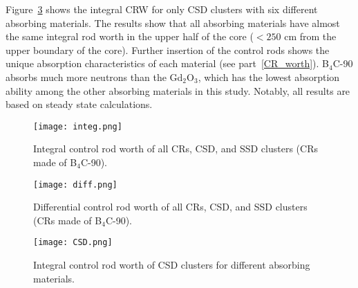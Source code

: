 Figure~\ref{fig:CSD} shows the integral CRW for only CSD clusters with six 
different absorbing materials. The results show that all absorbing materials 
have almost the same integral rod worth in the upper half of the core 
($<250$ cm from the upper boundary of the core). Further insertion of the 
control rods shows the unique absorption characteristics of each material (see 
part~\ref{CR_worth}). B$_4$C-90 absorbs much more neutrons than the 
Gd$_2$O$_3$, which has the lowest absorption ability among the other absorbing 
materials in this study. Notably, all results are based on steady state calculations. 

\begin{figure}
	\centering
	\texttt{[image: integ.png]}
	\vspace{-0.5in}
	\caption{Integral control rod worth of all CRs, CSD, and SSD clusters (CRs made of B$_4$C-90).} 
	\label{fig:integ}
\end{figure}
\begin{figure}
	\centering
	\texttt{[image: diff.png]}
	\vspace{-0.5in}
	\caption{Differential control rod worth of all CRs, CSD, and SSD clusters (CRs made of B$_4$C-90).} 
	\label{fig:diff}
\end{figure}
\begin{figure}
	\centering
	\texttt{[image: CSD.png]}
	\vspace{-0.5in}
	\caption{Integral control rod worth of CSD clusters for different absorbing materials.} 
	\label{fig:CSD}
\end{figure}